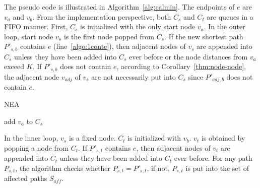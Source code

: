The pseudo code is illustrated in Algorithm~\ref{alg:calmin}.
The endpoints of $e$ are $v_a$ and $v_b$.
From the implementation perspective, both $C_s$ and $C_t$ are queues in a FIFO manner.
First, $C_s$ is initialized with the only start node $v_a$.
In the outer loop, start node $v_s$ is the first node popped from $C_s$.
If the new shortest path $P'_{s,b}$ contains $e$ (line~\ref{algo:1conte}), then adjacent nodes of $v_s$ are appended into $C_s$ unless they have been added into $C_s$ ever before or the node distances from $v_a$ exceed $K$. If $P'_{s,b}$ does not contain $e$, according to Corollary~\ref{thm:node-node}, the adjacent node $v_{adj}$ of $v_s$ are not necessarily put into $C_s$ since $P'_{{adj},b}$ does not contain $e$.
\begin{algorithm}[htbp]
{\small
    \caption{NEA}
    \label{alg:calmin}

   add $v_a$ to $C_s$\;


}
\end{algorithm}

In the inner loop, $v_s$ is a fixed node.
$C_t$ is initialized with $v_b$.
$v_t$ is obtained by popping a node from $C_t$.
If $P'_{s,t}$ contains $e$, then adjacent nodes of $v_t$ are appended into $C_t$ unless they have been added into $C_t$ ever before.
For any path $P_{s,t}$, the algorithm checks whether $P_{s,t}=P'_{s,t}$, if not, $P_{s,t}$ is put into the set of affected paths $S_\textit{aff}$.


